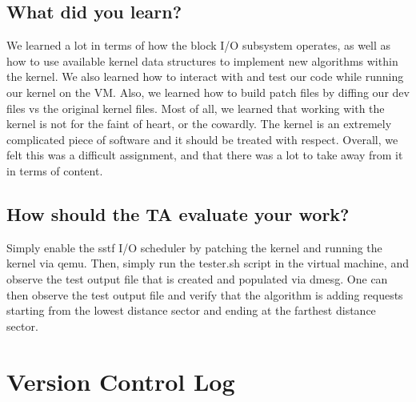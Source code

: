 \documentclass[onecolumn, draftclsnofoot,10pt, compsoc]{IEEEtran}
\begin{document}
\subsection{What did you learn?}
\noindent 
We learned a lot in terms of how the block I/O subsystem operates, as well as how to use available kernel data structures to implement new algorithms within the kernel. We also learned how to interact with and test our code while running our kernel on the VM. Also, we learned how to build patch files by diffing our dev files vs the original kernel files. Most of all, we learned that working with the kernel is not for the faint of heart, or the cowardly. The kernel is an extremely complicated piece of software and it should be treated with respect. Overall, we felt this was a difficult assignment, and that there was a lot to take away from it in terms of content.\\

\subsection{How should the TA evaluate your work?}
\noindent 
Simply enable the sstf I/O scheduler by patching the kernel and running the kernel via qemu. Then, simply run the tester.sh script in the virtual machine, and observe the test output file that is created and populated via dmesg. One can then observe the test output file and verify that the algorithm is adding requests starting from the lowest distance sector and ending at the farthest distance sector.

\section{Version Control Log}
\end{document}
